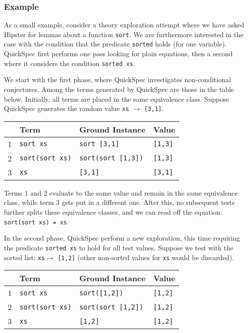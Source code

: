 \subsubsection*{Example}
As a small example, consider a theory exploration attempt where we have asked Hipster for lemmas about a function \texttt{sort}. We are furthermore interested in the case with the condition that the predicate \texttt{sorted} holds (for one variable). %
QuickSpec first performs one pass looking for plain equations, then a second where it considers the condition \texttt{sorted xs}. 

We start with the first phase, where QuickSpec investigates non-conditional conjectures. Among the terms generated by QuickSpec are those in the table below. Initially, all terms are placed in the same equivalence class. Suppose QuickSpec generates the random value \texttt{xs} $\rightarrow$ \texttt{[3,1]}.     

\begin{tabularx}{\textwidth}{l  X  X  X}
 & Term & Ground Instance & Value \\
 \hline
1 \quad &\texttt{sort xs} & \texttt{sort [3,1]} & \texttt{[1,3]} \\
2 \quad&\texttt{sort(sort xs)} &\texttt{sort(sort [1,3])} & \texttt{[1,3]}\\
3 \quad &\texttt{xs} &\texttt{[3,1]} & \texttt{[3,1]} \\
\end{tabularx}

\noindent Terms 1 and 2 evaluate to the same value and remain in the same equivalence class, while term 3 gets put in a different one. After this, no subsequent tests further splits these equivalence classes, and we can read off the equation: \texttt{sort(sort xs) = xs}.

In the second phase, QuickSpec perform a new exploration, this time requiring the predicate \texttt{sorted xs} to hold for all test values. Suppose we test with the sorted list: \texttt{xs}$ \rightarrow$ \texttt{[1,2]} (other non-sorted values for \texttt{xs} would be discarded).       

\begin{tabularx}{\textwidth}{l  X  X  X}
 & Term & Ground Instance & Value \\
 \hline
1 \quad &\texttt{sort xs} & \texttt{sort([1,2])} & \texttt{[1,2]} \\
2 \quad&\texttt{sort(sort xs)} &\texttt{sort(sort [1,2])} & \texttt{[1,2]}\\
3 \quad &\texttt{xs} &\texttt{[1,2]} & \texttt{[1,2]} \\
\end{tabularx}

